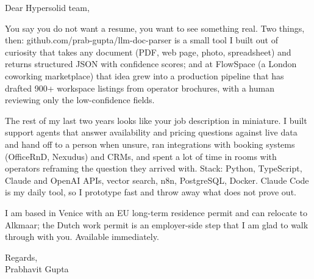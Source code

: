 \documentclass[a4paper,11pt]{article}
\begin{document}
Dear Hypersolid team,

You say you do not want a resume, you want to see something real. Two things, then: github.com/prab-gupta/llm-doc-parser is a small tool I built out of curiosity that takes any document (PDF, web page, photo, spreadsheet) and returns structured JSON with confidence scores; and at FlowSpace (a London coworking marketplace) that idea grew into a production pipeline that has drafted 900+ workspace listings from operator brochures, with a human reviewing only the low-confidence fields.

The rest of my last two years looks like your job description in miniature. I built support agents that answer availability and pricing questions against live data and hand off to a person when unsure, ran integrations with booking systems (OfficeRnD, Nexudus) and CRMs, and spent a lot of time in rooms with operators reframing the question they arrived with. Stack: Python, TypeScript, Claude and OpenAI APIs, vector search, n8n, PostgreSQL, Docker. Claude Code is my daily tool, so I prototype fast and throw away what does not prove out.

I am based in Venice with an EU long-term residence permit and can relocate to Alkmaar; the Dutch work permit is an employer-side step that I am glad to walk through with you. Available immediately.

Regards,\\
Prabhavit Gupta
\end{document}
